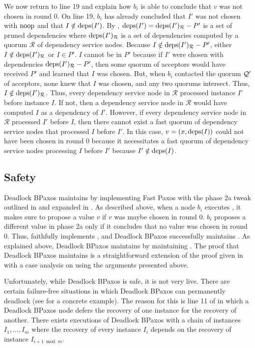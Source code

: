 We now return to line 19 and explain how $b_i$ is able to conclude that $v$ was
not chosen in round $0$. On line 19, $b_i$ has already concluded that $I'$ was
not chosen with $\text{noop}$ and that $I \notin \text{deps}(I')$. By
, $\text{deps}(I') = \text{deps}(I')_{\mathcal{R}} - P'$ is a
set of pruned dependencies where $\text{deps}(I')_{\mathcal{R}}$ is a set of
dependencies computed by a quorum $\mathcal{R}$ of dependency service nodes.
Because $I \notin \text{deps}(I')_{\mathcal{R}} - P'$, either $I \notin
\text{deps}(I')_{\mathcal{R}}$ or $I \in P'$.
%
$I$ cannot be in $P'$ because if $I'$ were chosen with dependencies
$\text{deps}(I')_{\mathcal{R}} - P'$, then some quorum of acceptors would have
received $P'$ and learned that $I$ was chosen. But, when $b_i$ contacted the
quorum $\mathcal{Q}'$ of acceptors, none knew that $I$ was chosen, and any two
quorums intersect.
%
Thus, $I \notin \text{deps}(I')_{\mathcal{R}}$. Thus, every dependency service node
in $\mathcal{R}$ processed instance $I'$ before instance $I$. If not, then a
dependency service node in $\mathcal{R}$ would have computed $I$ as a
dependency of $I'$. However, if every dependency service node in $\mathcal{R}$
processed $I'$ before $I$, then there cannot exist a fast quorum of dependency
service nodes that processed $I$ before $I'$. In this case, $v = (x, \text{deps}(I))$
could not have been chosen in round $0$ because it necessitates a fast quorum
of dependency service nodes processing $I$ before $I'$ because $I' \notin
\text{deps}(I)$.

\subsection{Safety}
Deadlock BPaxos maintains  by implementing Fast
Paxos with the phase 2a tweak outlined in  and expanded
in . As described above, when a node $b_i$ executes
, it makes sure to propose a value $v$ if $v$ was maybe
chosen in round $0$. $b_i$ proposes a different value in phase 2a only if it
concludes that no value was chosen in round $0$. Thus, 
faithfully implements , and Deadlock BPaxos
successfully maintains .
%
As explained above, Deadlock BPaxos maintains  by
maintaining . The proof that Deadlock BPaxos
maintains  is a straightforward extension of the
proof given in  with a case analysis on
 using the arguments presented above.

Unfortunately, while Deadlock BPaxos is safe, it is not very live. There are
certain failure-free situations in which Deadlock BPaxos can permanently
deadlock (see  for a concrete example). The reason
for this is line 11 of  in which a Deadlock BPaxos node
defers the recovery of one instance for the recovery of another. There exists
executions of Deadlock BPaxos with a chain of instances $I_1, \ldots, I_m$
where the recovery of every instance $I_i$ depends on the recovery of instance
$I_{i+1 \bmod m}$.
